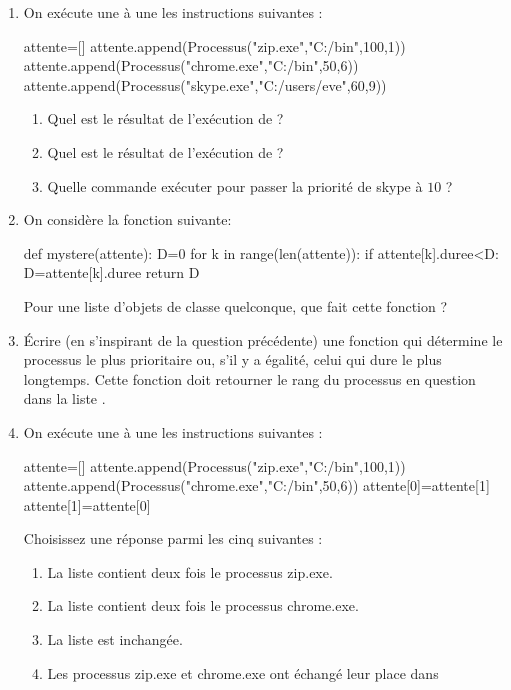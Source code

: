 \documentclass[11pt,a4paper,french,twoside]{PMCours}
\begin{document}
\begin{enumerate}
    \item On exécute une à une les instructions suivantes :
\begin{Python}
attente=[]
attente.append(Processus("zip.exe","C:/bin",100,1))
attente.append(Processus("chrome.exe","C:/bin",50,6))
attente.append(Processus("skype.exe","C:/users/eve",60,9))
\end{Python}
\begin{enumerate}
    \item Quel est le résultat de l'exécution de  ?
    \item Quel est le résultat de l'exécution de  ?
    \item Quelle commande exécuter pour passer la priorité de skype à $10$ ?
\end{enumerate}    
    \item On considère la fonction suivante:
\begin{Python}
def mystere(attente):
    D=0
    for k in range(len(attente)):
        if attente[k].duree<D:
            D=attente[k].duree
    return D
\end{Python}
    Pour une liste  d'objets de classe  quelconque,
    que fait cette fonction ?
    \item Écrire (en s'inspirant de la question précédente) une fonction 
     qui détermine
    le processus le plus prioritaire ou, s'il y a égalité, celui qui dure le 
    plus longtemps.
    Cette fonction doit retourner le rang du processus en question dans 
    la liste .
    \item On exécute une à une les instructions suivantes :
\begin{Python}
attente=[]
attente.append(Processus("zip.exe","C:/bin",100,1))
attente.append(Processus("chrome.exe","C:/bin",50,6))
attente[0]=attente[1]
attente[1]=attente[0]
\end{Python}
    Choisissez une réponse parmi les cinq suivantes :
    \begin{enumerate}
        \item La liste  contient deux fois le processus zip.exe. 
        \item La liste  contient deux fois le processus chrome.exe. 
        \item La liste  est inchangée. 
        \item Les processus zip.exe et chrome.exe ont échangé leur place dans 

\end{enumerate}
\end{enumerate}
\end{document}
